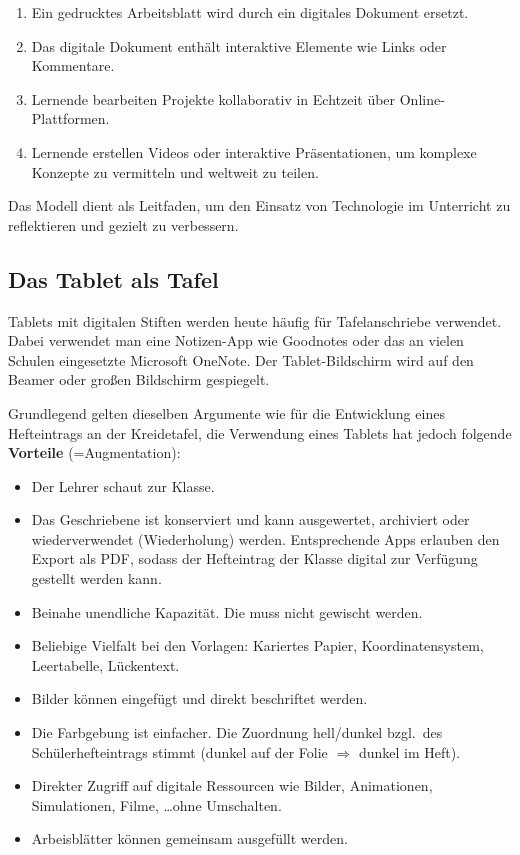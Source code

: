 \begin{beisp2}
	\begin{enumerate}
		\item Ein gedrucktes Arbeitsblatt wird durch ein digitales Dokument ersetzt.
		\item Das digitale Dokument enthält interaktive Elemente wie Links oder Kommentare.
		\item Lernende bearbeiten Projekte kollaborativ in Echtzeit über Online-Plattformen.
		\item Lernende erstellen Videos oder interaktive Präsentationen, um komplexe Konzepte zu vermitteln und weltweit zu teilen.
	\end{enumerate}
\end{beisp2}

Das Modell dient als Leitfaden, um den Einsatz von Technologie im Unterricht zu reflektieren und gezielt zu verbessern.

\subsection{Das Tablet als Tafel}
Tablets mit digitalen Stiften werden heute häufig für Tafelanschriebe verwendet. Dabei verwendet man eine Notizen-App wie Goodnotes oder das an vielen Schulen eingesetzte Microsoft OneNote. Der Tablet-Bildschirm wird auf den Beamer oder großen Bildschirm gespiegelt.

\mip
Grundlegend gelten dieselben Argumente wie für die Entwicklung eines Hefteintrags an der Kreidetafel, die Verwendung eines Tablets hat jedoch folgende \textbf{Vorteile} (=Augmentation):
\begin{itemize}
	\item Der Lehrer schaut zur Klasse.
	\item Das Geschriebene ist konserviert und kann 	ausgewertet, archiviert oder wiederverwendet (Wiederholung) werden. Entsprechende Apps erlauben den Export als PDF, sodass der Hefteintrag der Klasse digital zur Verfügung gestellt werden kann.
	\item Beinahe unendliche Kapazit\"{a}t. Die  muss nicht gewischt werden.
	\item Beliebige Vielfalt bei den Vorlagen: Kariertes Papier, Koordinatensystem, Leertabelle, L\"{u}ckentext.
	\item Bilder können eingefügt und direkt beschriftet werden.
	\item
	Die Farbgebung ist einfacher.
	Die Zuordnung hell/dunkel bzgl.\ des Sch\"{u}lerhefteintrags stimmt
	(dunkel auf der Folie $\Rightarrow$ dunkel im Heft).
	\item Direkter Zugriff auf digitale Ressourcen wie Bilder, Animationen, Simulationen, Filme, \dots ohne Umschalten.
	\item Arbeisblätter können gemeinsam ausgefüllt werden.
\end{itemize}

